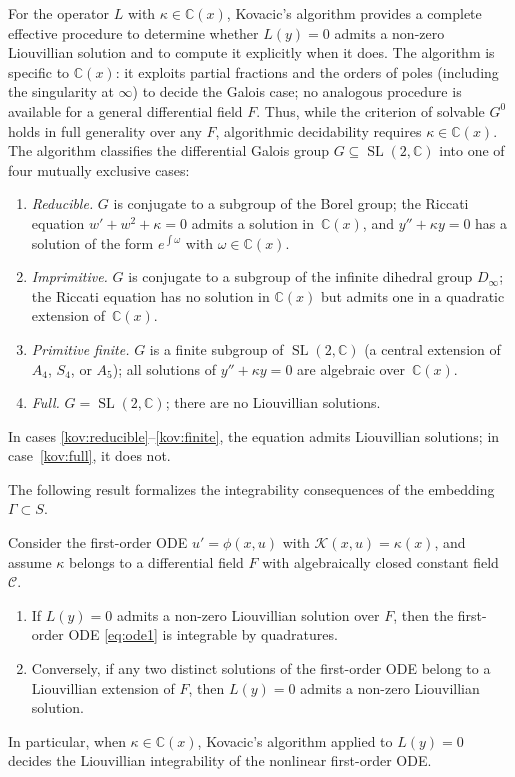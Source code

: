 \documentclass[preprint,a4paper]{elsarticle}
\begin{document}
For the operator $L$ with $\kappa\in\mathbb{C}(x)$, Kovacic's algorithm \cite{Kovacic1986} provides a complete effective procedure to determine whether $L(y)=0$ admits a non-zero Liouvillian solution and to compute it explicitly when it does. The algorithm is specific to $\mathbb{C}(x)$: it exploits partial fractions and the orders of poles (including the singularity at $\infty$) to decide the Galois case; no analogous procedure is available for a general differential field $F$. Thus, while the criterion of solvable $G^0$ holds in full generality over any $F$, algorithmic decidability requires $\kappa\in\mathbb{C}(x)$. The algorithm classifies the differential Galois group $G\subseteq\operatorname{SL}(2,\mathbb{C})$ into one of four mutually exclusive cases:
\begin{enumerate}[label=\textup{(\roman*)}]
\item\label{kov:reducible} \emph{Reducible.} $G$ is conjugate to a subgroup of the Borel group; the Riccati equation $w'+w^2+\kappa=0$ admits a solution in~$\mathbb{C}(x)$, and $y''+\kappa y=0$ has a solution of the form $e^{\int\omega}$ with $\omega\in\mathbb{C}(x)$.
\item\label{kov:imprimitive} \emph{Imprimitive.} $G$ is conjugate to a subgroup of the infinite dihedral group $D_\infty$; the Riccati equation has no solution in $\mathbb{C}(x)$ but admits one in a quadratic extension of~$\mathbb{C}(x)$.
\item\label{kov:finite} \emph{Primitive finite.} $G$ is a finite subgroup of $\operatorname{SL}(2,\mathbb{C})$ (a central extension of $A_4$, $S_4$, or $A_5$); all solutions of $y''+\kappa y=0$ are algebraic over~$\mathbb{C}(x)$.
\item\label{kov:full} \emph{Full.} $G=\operatorname{SL}(2,\mathbb{C})$; there are no Liouvillian solutions.
\end{enumerate}
In cases \ref{kov:reducible}--\ref{kov:finite}, the equation admits Liouvillian solutions; in case~\ref{kov:full}, it does not.

The following result formalizes the integrability consequences of the embedding $\Gamma\subset S$.

\begin{theorem}\label{thm:galois_integrability}
Consider the first-order ODE $u'=\phi(x,u)$ with $\mathcal{K}(x,u)=\kappa(x)$, and assume $\kappa$ belongs to a differential field $F$ with algebraically closed constant field~$\mathcal{C}$.
\begin{enumerate}[label=\textup{(\alph*)}]
\item\label{it:galois_forward} If $L(y)=0$ admits a non-zero Liouvillian solution over $F$, then the first-order ODE \eqref{eq:ode1} is integrable by quadratures.
\item\label{it:galois_converse} Conversely, if any two distinct solutions of the first-order ODE belong to a Liouvillian extension of $F$, then $L(y)=0$ admits a non-zero Liouvillian solution.
\end{enumerate}
In particular, when $\kappa\in\mathbb{C}(x)$, Kovacic's algorithm applied to $L(y)=0$ decides the Liouvillian integrability of the nonlinear first-order ODE.
\end{theorem}
\end{document}

